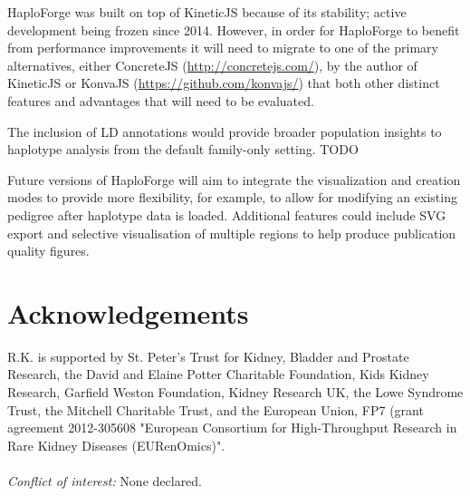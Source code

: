 \documentclass{bioinfo}
\numberwithin{equation}{section}
\def\haplo{{HaploForge}}
\begin{document}
\haplo{} was built on top of KineticJS because of its stability; active development being frozen since 2014. However, in order for \haplo{} to benefit from performance improvements it will need to migrate to one of the primary alternatives, either {ConcreteJS (\url{http://concretejs.com/})}, by the author of KineticJS or {KonvaJS (\url{https://github.com/konvajs/})} that both other distinct features and advantages that will need to be evaluated.

The inclusion of LD annotations would provide broader population insights to haplotype analysis from the default family-only setting. TODO


Future versions of \haplo{} will aim to integrate the visualization and creation modes to provide more flexibility, for example, to allow for modifying an existing pedigree after haplotype data is loaded.
Additional features could include SVG export and selective visualisation of multiple regions to help produce publication quality figures.

\enlargethispage{1.8cm}

\vspace{-0.5cm}
\section*{Acknowledgements}

R.K. is supported by St. Peter's Trust for Kidney, Bladder and Prostate Research, the David and Elaine Potter Charitable Foundation, Kids Kidney Research, Garfield Weston Foundation, Kidney Research UK, the Lowe Syndrome Trust, the Mitchell Charitable Trust, and the European Union, FP7 (grant agreement 2012-305608 "European Consortium for High-Throughput Research in Rare Kidney Diseases (EURenOmics)".\\\
\\
\noindent
\textit{Conflict of interest:} None declared.

\vspace{-0.2cm}


\end{document}
